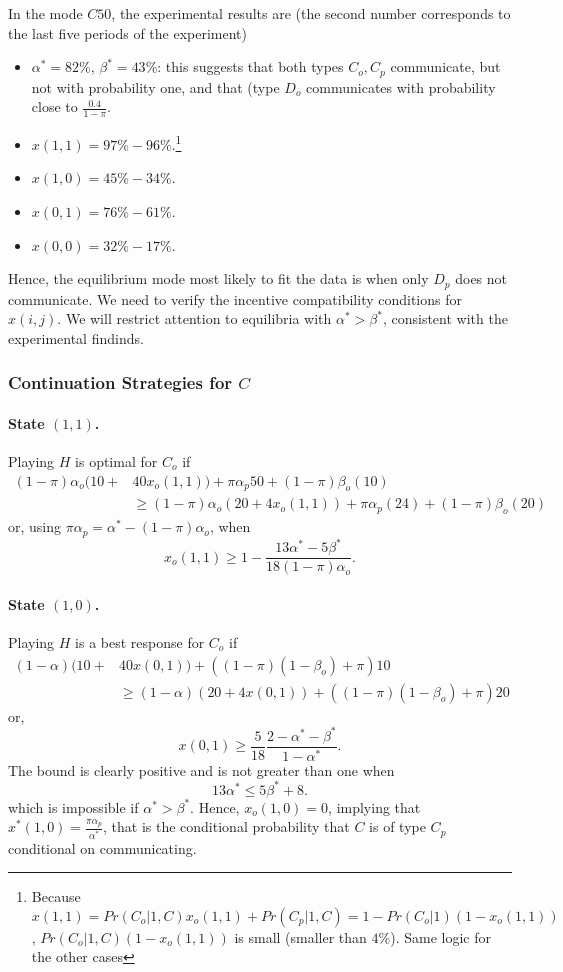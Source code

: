 \documentclass[12pt]{article}
\begin{document}
In the mode $C50$, the experimental results are (the second number corresponds to the last five periods of the experiment)
\begin{itemize}\setlength\itemsep{0em}
	\item $\alpha^*=82\%$, $\beta^*=43\%$: this suggests that both types $C_o,C_p$ communicate, but not with probability one, and that (type $D_o$ communicates with probability close to $\frac{0.4}{1-\pi}$.
	\item  $x(1,1)=97\% - 96\%$.\footnote{Because $x(1,1)=Pr(C_o|1,C)x_o(1,1)+Pr(C_p|1,C)= 1-Pr(C_o|1)(1-x_o(1,1))$, $Pr(C_o|1,C)(1-x_o(1,1))$ is small (smaller than $4\%$). Same logic for the other cases}
	\item $x(1,0)=45\% - 34\%$.
	\item $x(0,1)=76\% - 61\%$.
	\item $x(0,0)=32\% - 17\%$.	
\end{itemize}
%
Hence, the equilibrium mode most likely to fit the data is when only $D_p$ does not communicate. We need to verify the incentive compatibility conditions for $x(i,j)$. We will restrict attention to equilibria with $\alpha^*>\beta^*$, consistent with the experimental findinds.

\subsubsection*{Continuation Strategies for $C$}
\paragraph{State $(1,1)$.} Playing $H$ is optimal for $C_o$ if
\[\begin{split}
	(1-\pi)\alpha_o (10+&40 x_o(1,1))+\pi \alpha_p 50+(1-\pi)\beta_o (10)\\
		&\geq (1-\pi)\alpha_o (20+4 x_o(1,1))+\pi \alpha_p (24)+(1-\pi)\beta_o (20)
\end{split}
\]
or, using $\pi\alpha_p=\alpha^*-(1-\pi)\alpha_o$, when
\begin{equation}\label{c50-x11}
	x_o(1,1)\geq 1-\frac{13\alpha^*-5\beta^*}{18(1-\pi)\alpha_o}.	
\end{equation}
%
\paragraph{State $(1,0)$.} Playing $H$ is a best response for $C_o$ if
\[\begin{split}
	(1-\alpha) (10+&40 x(0,1))+((1-\pi)(1-\beta_o)+\pi) 10\\
	&\geq (1-\alpha) (20+4 x(0,1))+((1-\pi)(1-\beta_o)+\pi) 20
\end{split}
\]
or,
\[
x(0,1)\geq \frac{5}{18}\frac{2-\alpha^*-\beta^*}{1-\alpha^*}.
\]
The bound is clearly positive and is not greater than one when 
\begin{equation*}
	13\alpha^* \leq  5\beta^*+8.
\end{equation*}
%
which is impossible if $\alpha^*>\beta^*$. Hence, $x_o(1,0)=0$, implying that $x^*(1,0)=\frac{\pi \alpha_p}{\alpha^*}$, that is the conditional probability that $C$ is of type $C_p$ conditional on communicating.
%							
\end{document}
